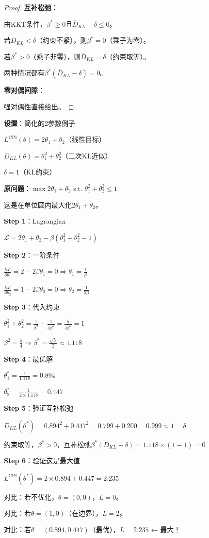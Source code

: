 \documentclass[11pt,a4paper]{article}
\theoremstyle{definition}
\begin{document}
\begin{proof}
\textbf{互补松弛}：

由KKT条件，$\beta^* \geq 0$且$\bar{D}_{KL} - \delta \leq 0$。

若$\bar{D}_{KL} < \delta$（约束不紧），则$\beta^* = 0$（乘子为零）。

若$\beta^* > 0$（乘子非零），则$\bar{D}_{KL} = \delta$（约束取等）。

两种情况都有$\beta^*(\bar{D}_{KL} - \delta) = 0$。

\textbf{零对偶间隙}：

强对偶性直接给出。
\end{proof}

\begin{calculation}[手算：互补松弛的验证]
\textbf{设置}：简化的2参数例子

$L^{\text{CPI}}(\theta) = 2\theta_1 + \theta_2$（线性目标）

$D_{KL}(\theta) = \theta_1^2 + \theta_2^2$（二次KL近似）

$\delta = 1$（KL约束）

\textbf{原问题}：$\max 2\theta_1 + \theta_2$ s.t. $\theta_1^2 + \theta_2^2 \leq 1$

这是在单位圆内最大化$2\theta_1 + \theta_2$。

\textbf{Step 1}：Lagrangian

$\mathcal{L} = 2\theta_1 + \theta_2 - \beta(\theta_1^2 + \theta_2^2 - 1)$

\textbf{Step 2}：一阶条件

$\frac{\partial \mathcal{L}}{\partial \theta_1} = 2 - 2\beta\theta_1 = 0 \Rightarrow \theta_1 = \frac{1}{\beta}$

$\frac{\partial \mathcal{L}}{\partial \theta_2} = 1 - 2\beta\theta_2 = 0 \Rightarrow \theta_2 = \frac{1}{2\beta}$

\textbf{Step 3}：代入约束

$\theta_1^2 + \theta_2^2 = \frac{1}{\beta^2} + \frac{1}{4\beta^2} = \frac{5}{4\beta^2} = 1$

$\beta^2 = \frac{5}{4} \Rightarrow \beta^* = \frac{\sqrt{5}}{2} \approx 1.118$

\textbf{Step 4}：最优解

$\theta_1^* = \frac{1}{1.118} = 0.894$

$\theta_2^* = \frac{1}{2 \times 1.118} = 0.447$

\textbf{Step 5}：验证互补松弛

$D_{KL}(\theta^*) = 0.894^2 + 0.447^2 = 0.799 + 0.200 = 0.999 \approx 1 = \delta$ \checkmark

约束取等，$\beta^* > 0$，互补松弛$\beta^*(D_{KL} - \delta) = 1.118 \times (1 - 1) = 0$ \checkmark

\textbf{Step 6}：验证这是最大值

$L^{\text{CPI}}(\theta^*) = 2 \times 0.894 + 0.447 = 2.235$

对比：若不优化，$\theta = (0, 0)$，$L = 0$。

对比：若$\theta = (1, 0)$（在边界），$L = 2$。

对比：若$\theta = (0.894, 0.447)$（最优），$L = 2.235$ ← 最大！
\end{calculation}
\end{document}
